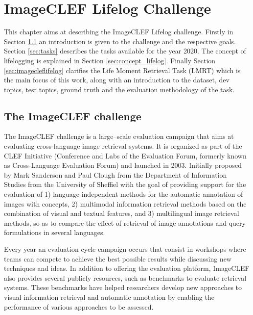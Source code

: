 \cleardoublepage

\chapter{ImageCLEF Lifelog Challenge}
\label{ch:imageclef}

This chapter aims at describing the ImageCLEF Lifelog challenge. Firstly in Section \ref{sec:introduct} an introduction is given to the challenge and the respective goals. Section \ref{sec:tasks} describes the tasks available for the year 2020. The concept of lifelogging is explained in Section \ref{sec:concept_lifelog}. Finally Section \ref{sec:imagecleflifelog} clarifies the Life Moment Retrieval Task (LMRT) which is the main focus of this work, along with an introduction to the dataset, dev topics, test topics, ground truth and the evaluation methodology of the task.



\section{The ImageCLEF challenge}
\label{sec:introduct}

The ImageCLEF challenge is a large–scale evaluation campaign that aims at evaluating cross-language image retrieval systems. It is organized as part of the CLEF Initiative (Conference and Labs of the Evaluation Forum, formerly known as Cross-Language Evaluation Forum) and launched in  2003. Initially proposed by Mark Sanderson and Paul Clough from the Department of Information Studies from the University of Sheffiel with the goal of providing support for the evaluation of 1) language-independent methods for the automatic annotation of images with concepts, 2) multimodal information retrieval methods based on the combination of visual and textual features, and 3) multilingual image retrieval methods, so as to compare the effect of retrieval of image annotations and query formulations in several languages.


Every year an evaluation cycle campaign occurs that consist in workshops where teams can compete to achieve the best possible results while discussing new techniques and ideas. In addition to offering the evaluation platform, ImageCLEF also provides several publicly resources, such as benchmarks to evaluate retrieval systems. These benchmarks have helped researchers develop new approaches to visual information retrieval and automatic annotation by enabling the performance of various approaches to be assessed.


